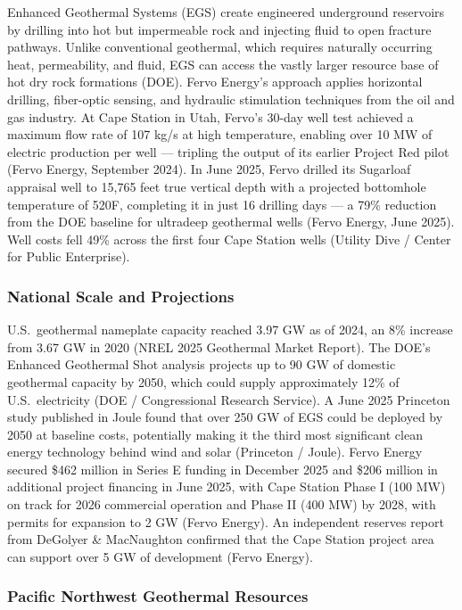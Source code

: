 \documentclass[11pt,letterpaper]{article}
\begin{document}
Enhanced Geothermal Systems (EGS) create engineered underground reservoirs by drilling into hot but impermeable rock and injecting fluid to open fracture pathways. Unlike conventional geothermal, which requires naturally occurring heat, permeability, and fluid, EGS can access the vastly larger resource base of hot dry rock formations (DOE). Fervo Energy's approach applies horizontal drilling, fiber-optic sensing, and hydraulic stimulation techniques from the oil and gas industry. At Cape Station in Utah, Fervo's 30-day well test achieved a maximum flow rate of 107 kg/s at high temperature, enabling over 10 MW of electric production per well --- tripling the output of its earlier Project Red pilot (Fervo Energy, September 2024). In June 2025, Fervo drilled its Sugarloaf appraisal well to 15,765 feet true vertical depth with a projected bottomhole temperature of 520\textdegree F, completing it in just 16 drilling days --- a 79\% reduction from the DOE baseline for ultradeep geothermal wells (Fervo Energy, June 2025). Well costs fell 49\% across the first four Cape Station wells (Utility Dive / Center for Public Enterprise).

\subsubsection{National Scale and Projections}

U.S.\ geothermal nameplate capacity reached 3.97 GW as of 2024, an 8\% increase from 3.67 GW in 2020 (NREL 2025 Geothermal Market Report). The DOE's Enhanced Geothermal Shot analysis projects up to 90 GW of domestic geothermal capacity by 2050, which could supply approximately 12\% of U.S.\ electricity (DOE / Congressional Research Service). A June 2025 Princeton study published in Joule found that over 250 GW of EGS could be deployed by 2050 at baseline costs, potentially making it the third most significant clean energy technology behind wind and solar (Princeton / Joule). Fervo Energy secured \$462 million in Series E funding in December 2025 and \$206 million in additional project financing in June 2025, with Cape Station Phase I (100 MW) on track for 2026 commercial operation and Phase II (400 MW) by 2028, with permits for expansion to 2 GW (Fervo Energy). An independent reserves report from DeGolyer \& MacNaughton confirmed that the Cape Station project area can support over 5 GW of development (Fervo Energy).

\subsubsection{Pacific Northwest Geothermal Resources}
\end{document}
